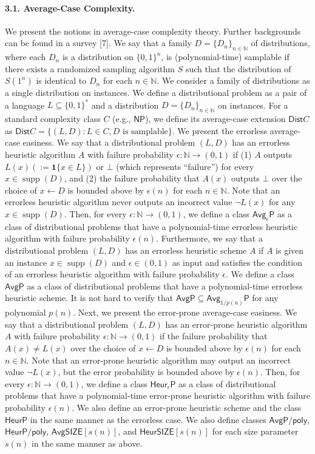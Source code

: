 \documentclass[10pt,a4paper]{article}
\begin{document}
\paragraph{3.1. Average-Case Complexity.}
We present the notions in average-case complexity theory. Further backgrounds can be found in a survey [7].
We say that a family $D=\{D_n\}_{n\in\mathbb N}$ of distributions, where each $D_n$ is a distribution on $\{0,1\}^n$, is (polynomial-time) samplable if there exists a randomized sampling algorithm $S$ such that the distribution of $S(1^n)$ is identical to $D_n$ for each $n\in\mathbb N$. We consider a family of distributions as a single distribution on instances. We define a distributional problem as a pair of a language $L\subseteq\{0,1\}^*$ and a distribution $D=\{D_n\}_{n\in\mathbb N}$ on instances. For a standard complexity class $C$ (e.g., $\mathsf{NP}$), we define its average-case extension $\mathsf{Dist}C$ as $\mathsf{Dist}C=\{(L,D):L\in C,D\text{ is samplable}\}$.
We present the errorless average-case easiness. We say that a distributional problem $(L,D)$ has an errorless heuristic algorithm $A$ with failure probability $\epsilon:\mathbb N\to(0,1)$ if (1) $A$ outputs $L(x)(:=\mathbf1\{x\in L\})$ or $\bot$ (which represents ``failure'') for every $x\in\operatorname{supp}(D)$, and (2) the failure probability that $A(x)$ outputs $\bot$ over the choice of $x\leftarrow D$ is bounded above by $\epsilon(n)$ for each $n\in\mathbb N$. Note that an errorless heuristic algorithm never outputs an incorrect value $\neg L(x)$ for any $x\in\operatorname{supp}(D)$. Then, for every $\epsilon:\mathbb N\to(0,1)$, we define a class $\mathsf{Avg}_\epsilon\mathsf P$ as a class of distributional problems that have a polynomial-time errorless heuristic algorithm with failure probability $\epsilon(n)$. Furthermore, we say that a distributional problem $(L,D)$ has an errorless heuristic scheme $A$ if $A$ is given an instance $x\in\operatorname{supp}(D)$ and $\epsilon\in(0,1)$ as input and satisfies the condition of an errorless heuristic algorithm with failure probability $\epsilon$. We define a class $\mathsf{AvgP}$ as a class of distributional problems that have a polynomial-time errorless heuristic scheme. It is not hard to verify that $\mathsf{AvgP}\subseteq\mathsf{Avg}_{1/p(n)}\mathsf P$ for any polynomial $p(n)$.
Next, we present the error-prone average-case easiness. We say that a distributional problem $(L,D)$ has an error-prone heuristic algorithm $A$ with failure probability $\epsilon:\mathbb N\to(0,1)$ if the failure probability that $A(x)\neq L(x)$ over the choice of $x\leftarrow D$ is bounded above by $\epsilon(n)$ for each $n\in\mathbb N$. Note that an error-prone heuristic algorithm may output an incorrect value $\neg L(x)$, but the error probability is bounded above by $\epsilon(n)$. Then, for every $\epsilon:\mathbb N\to(0,1)$, we define a class $\mathsf{Heur}_\epsilon\mathsf P$ as a class of distributional problems that have a polynomial-time error-prone heuristic algorithm with failure probability $\epsilon(n)$. We also define an error-prone heuristic scheme and the class $\mathsf{HeurP}$ in the same manner as the errorless case.
We also define classes $\mathsf{AvgP/poly}$, $\mathsf{HeurP/poly}$, $\mathsf{AvgSIZE}[s(n)]$, and $\mathsf{HeurSIZE}[s(n)]$ for each size parameter $s(n)$ in the same manner as above.
\end{document}
